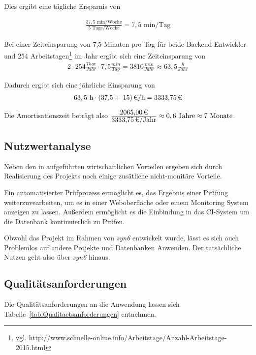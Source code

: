 Dies ergibt eine tägliche Ersparnis von

\begin{eqnarray}
\frac{37,5 \mbox{ min/Woche}}{5 \mbox{ Tage/Woche}} = 7,5 \mbox{ min/Tag}
\end{eqnarray}

Bei einer Zeiteinsparung von 7,5 Minuten pro Tag für beide Backend Entwickler und 254 Arbeitstagen\footnote{vgl. http://www.schnelle-online.info/Arbeitstage/Anzahl-Arbeitstage-2015.html} im Jahr ergibt sich eine Zeiteinsparung von 
\begin{eqnarray}
2 \cdot 254 \frac{Tage}{Jahr} \cdot 7,5 \frac{min}{Tag} = 3810 \frac{min}{Jahr} \approx 63,5 \frac{h}{Jahr} 
\end{eqnarray}

Dadurch ergibt sich eine jährliche Einsparung von 
\begin{eqnarray}
63,5 \mbox{ h} \cdot \eur{(37,5 + 15)}{\mbox{/h}} = \eur{3333,75}
\end{eqnarray}

Die Amortisationszeit beträgt also $\frac{\eur{2065,00}}{\eur{3333,75}\mbox{/Jahr}} \approx 0,6 \mbox{ Jahre} \approx 7 \mbox{ Monate}$.


\subsection{Nutzwertanalyse}
\label{sec:Nutzwertanalyse}

Neben den in  aufgeführten wirtschaftlichen Vorteilen ergeben sich durch Realisierung des Projekts noch einige zusätliche nicht-monitäre Vorteile.

Ein automatisierter Prüfprozess ermöglicht es, das Ergebnis einer Prüfung weiterzuvearbeiten, um es \zB in einer Weboberfläche oder einem Monitoring System anzeigen zu lassen. Außerdem ermöglicht es die Einbindung in das \acs{CI}-System um die Datenbank kontinuierlich zu Prüfen. 

Obwohl das Projekt im Rahmen von \textit{syn6} entwickelt wurde, lässt es sich auch Problemlos auf andere Projekte und Datenbanken Anwenden. Der tatsächliche Nutzen geht also über \textit{syn6} hinaus.


\subsection{Qualitätsanforderungen}
\label{sec:Qualitaetsanforderungen}

Die Qualitätsanforderungen an die Anwendung lassen sich Tabelle~\ref{tab:Qualitaetsanforderungen} entnehmen.

